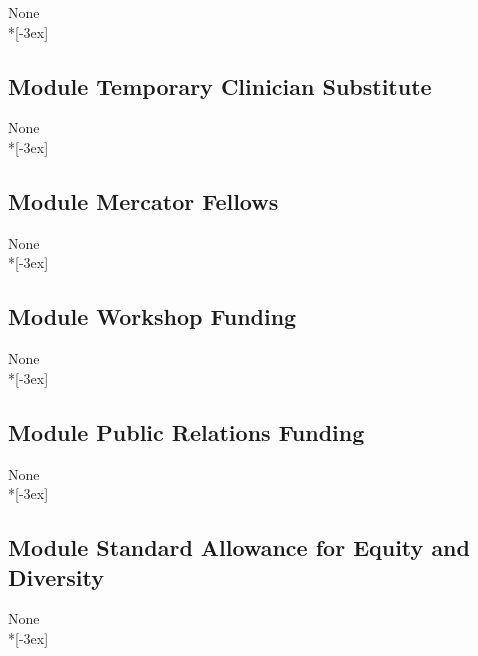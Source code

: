 \documentclass[11pt,a4paper,twoside]{scrartcl}
\begin{document}
\qquad \quad None\\*[-3ex]


\subsection{Module Temporary Clinician Substitute}

\qquad \quad None\\*[-3ex]

\subsection{Module Mercator Fellows}

\qquad \quad None\\*[-3ex]

\subsection{Module Workshop Funding}

\qquad \quad None\\*[-3ex]

\subsection{Module Public Relations Funding}

\qquad \quad None\\*[-3ex]

\subsection{Module Standard Allowance for Equity and Diversity}

\qquad \quad None\\*[-3ex]
\end{document}

